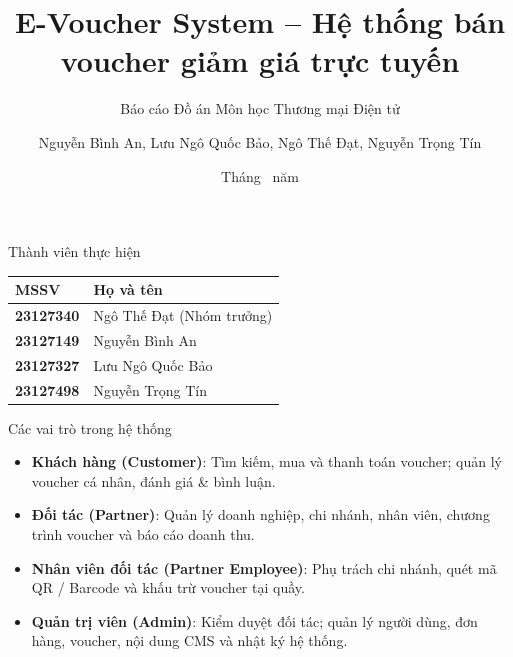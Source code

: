 \documentclass{beamer}
\title[E-Voucher System]{E-Voucher System -- Hệ thống bán voucher giảm giá trực tuyến}
\subtitle{Báo cáo Đồ án Môn học Thương mại Điện tử}
\author[Nhóm sinh viên]{Nguyễn Bình An, Lưu Ngô Quốc Bảo, Ngô Thế Đạt, Nguyễn Trọng Tín}
\institute[HCMUS]{Trường Đại học Khoa học Tự nhiên -- ĐHQG-HCM}
\date{Tháng \the\month~năm \the\year}
\begin{document}
\begin{frame}
  \titlepage
\end{frame}

\begin{frame}{Thành viên thực hiện}
\begin{center}
\begin{tabular}{>{\bfseries}l l}
MSSV & Họ và tên \\
\midrule
23127340 & Ngô Thế Đạt (Nhóm trưởng) \\
23127149 & Nguyễn Bình An \\
23127327 & Lưu Ngô Quốc Bảo \\
23127498 & Nguyễn Trọng Tín \\
\end{tabular}
\end{center}
\end{frame}

\begin{frame}{Các vai trò trong hệ thống}
\begin{itemize}
  \item \textbf{Khách hàng (Customer)}: Tìm kiếm, mua và thanh toán voucher; quản lý voucher cá nhân, đánh giá \& bình luận.
  \item \textbf{Đối tác (Partner)}: Quản lý doanh nghiệp, chi nhánh, nhân viên, chương trình voucher và báo cáo doanh thu.
  \item \textbf{Nhân viên đối tác (Partner Employee)}: Phụ trách chi nhánh, quét mã QR / Barcode và khấu trừ voucher tại quầy.
  \item \textbf{Quản trị viên (Admin)}: Kiểm duyệt đối tác; quản lý người dùng, đơn hàng, voucher, nội dung CMS và nhật ký hệ thống.
\end{itemize}
\end{frame}
\end{document}
